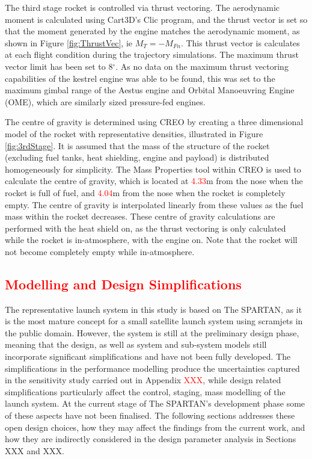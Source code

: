 		The third stage rocket is controlled via thrust vectoring. The aerodynamic moment is calculated using Cart3D's Clic program, and the thrust vector is set so that the moment generated by the engine matches the aerodynamic moment, as shown in Figure \ref{fig:ThrustVec}, ie $M_{T} = -M_{Fn}$. This thrust vector is calculates at each flight condition during the trajectory simulations. The maximum thrust vector limit has been set to 8$^\circ$. As no data on the maximum thrust vectoring capabilities of the kestrel engine was able to be found, this was set to the maximum gimbal range of the Aestus engine and Orbital Manoeuvring Engine (OME), which are similarly sized pressure-fed engines\cite{Wade2017}.
		
		The centre of gravity is determined using CREO by creating a three dimensional model of the rocket with representative densities, illustrated in Figure \ref{fig:3rdStage}. It is assumed that the mass of the structure of the rocket (excluding fuel tanks, heat shielding, engine and payload) is distributed homogeneously for simplicity. The Mass Properties tool within CREO is used to calculate the centre of gravity, which is located at \textcolor{red}{4.33}m from the nose when the rocket is full of fuel, and \textcolor{red}{4.04}m from the nose when the rocket is completely empty. The centre of gravity is interpolated linearly from these values as the fuel mass within the rocket decreases. These centre of gravity calculations are performed with the heat shield on, as the thrust vectoring is only calculated while the rocket is in-atmosphere, with the engine on. Note that the rocket will not become completely empty while in-atmosphere. 
		
	
		

\textcolor{red}{
\section{Modelling and Design Simplifications}  %
}

The representative launch system in this study is based on The SPARTAN\cite{Preller2017b}, as it is the most mature concept for a small satellite launch system using scramjets in the public domain. However, the system is still at the preliminary design phase, meaning that the design, as well as system and sub-system models still incorporate significant simplifications and have not been fully developed. 
The simplifications in the performance modelling produce the uncertainties captured in the sensitivity study carried out in Appendix \textcolor{red}{XXX}, while design related simplifications particularly affect the control, staging, mass modelling of the launch system. At the current stage of The SPARTAN's development phase some of these aspects have not been finalised. 
The following sections addresses these open design choices, how they may affect the findings from the current work, and how they are indirectly considered in the design parameter analysis in Sections XXX and XXX. 

